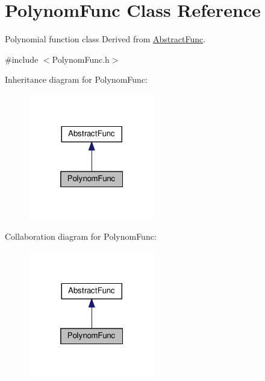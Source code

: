 \hypertarget{classPolynomFunc}{}\section{Polynom\+Func Class Reference}
\label{classPolynomFunc}


Polynomial function class Derived from \hyperlink{classAbstractFunc}{Abstract\+Func}.  




{\ttfamily \#include $<$Polynom\+Func.\+h$>$}



Inheritance diagram for Polynom\+Func\+:\nopagebreak
\begin{figure}[H]
\begin{center}
\leavevmode
\includegraphics[width=157pt]{classPolynomFunc__inherit__graph}
\end{center}
\end{figure}


Collaboration diagram for Polynom\+Func\+:\nopagebreak
\begin{figure}[H]
\begin{center}
\leavevmode
\includegraphics[width=157pt]{classPolynomFunc__coll__graph}
\end{center}
\end{figure}
